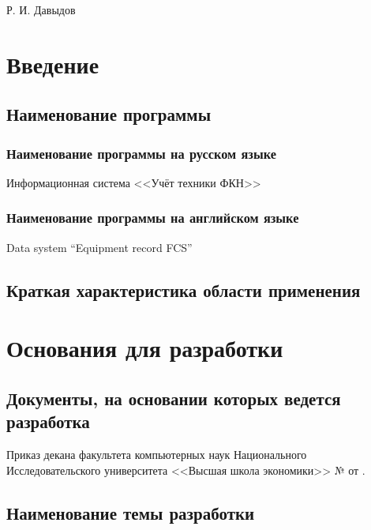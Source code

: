\documentclass[a4paper,12pt,reqno]{article}
\begin{document}
	
	
	
	
	{Р. И. Давыдов}
	
	\firstPage
						\newpage
	\secondPage
						\newpage
	\thirdPage
						\newpage
	\section{Введение}
	\subsection{Наименование программы}
	\subsubsection{Наименование программы на русском языке}
	{Информационная система <<Учёт техники ФКН>>}
	\subsubsection{Наименование программы на английском языке}
	{Data system “Equipment record FCS”}
	\subsection{Краткая характеристика области применения}
	
	\newpage
	\section{Основания для разработки}
	\subsection{Документы, на основании которых ведется разработка}
	
	
	Приказ декана факультета компьютерных наук Национального Исследовательского университета <<Высшая школа экономики>> № {\color{red}{TODO}} от {\color{red}{TODO}}.
	
	\subsection{Наименование темы разработки}
	
\end{document}
